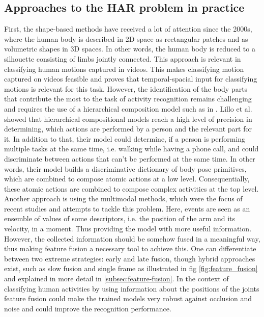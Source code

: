 \subsection{Approaches to the HAR problem in practice}\label{subsec:approachesHAR}
First, the shape-based methods have received a lot of attention since the 2000s, where the human body is described in 2D space as rectangular patches and as volumetric shapes in 3D spaces. In other words, the human body is reduced to a silhouette consisting of limbs jointly connected. This approach is relevant in classifying human motions captured in videos\cite{vrigkas2015review}. This makes classifying motion captured on videos feasible and proves that temporal-spacial input for classifying motions is relevant for this task. However, the identification of the body parts that contribute the most to the task of activity recognition remains challenging and requires the use of a hierarchical composition model such as in \cite{lillo2014discriminative}. Lillo et al. showed that hierarchical compositional models reach a high level of precision in determining, which actions are performed by a person and the relevant part for it. In addition to that, their model could determine, if a person is performing multiple tasks at the same time, i.e. walking while having a phone call, and could discriminate between actions that can't be performed at the same time. In other words, their model builds a discriminative dictionary of body pose primitives, which are combined to compose atomic actions at a low level. Consequentially, these atomic actions are combined to compose complex activities at the top level\cite{lillo2014discriminative}.\newline
Another approach is using the multimodal methods, which were the focus of recent studies and attempts to tackle this problem. Here, events are seen as an ensemble of values of some descriptors, i.e. the position of the arm and its velocity, in a moment. Thus providing the model with more useful information. However, the collected information should be somehow fused in a meaningful way, thus making feature fusion a necessary tool to achieve this. One can differentiate between two extreme strategies: early and late fusion, though hybrid approaches exist, such as slow fusion and single frame as illustrated in fig \ref{fig:feature_fusion} and explained in more detail in \ref{subsec:feature-fusion}. In the context of classifying human activities by using information about the positions of the joints feature fusion could make the trained models very robust against occlusion and noise and could improve the recognition performance\cite{vrigkas2015review}.
